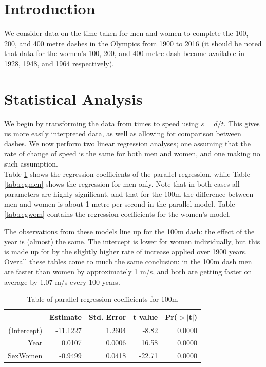 \documentclass[11pt]{article}
\begin{document}
\section{Introduction}
We consider data on the time taken for men and women to complete the 100, 200, and 400 metre dashes in the Olympics from 1900 to 2016 (it should be noted that data for the women's 100, 200, and 400 metre dash became available in 1928, 1948, and 1964 respectively). 

\section{Statistical Analysis}
We begin by transforming the data from times to speed using $s = d/t$. This gives us more easily interpreted data, as well as allowing for comparison between dashes. We now perform two linear regression analyses; one assuming that the rate of change of speed is the same for both men and women, and one making no such assumption.  \\

Table \ref{tab:reg1} shows the regression coefficients of the parallel regression, while Table \ref{tab:regmen} shows the regression for men only. Note that in both cases all parameters are highly significant, and that for the 100m the difference between men and women is about 1 metre per second in the parallel model. Table \ref{tab:regwom} contains the regression coefficients for the women's model.

The observations from these models line up for the 100m dash: the effect of the year is (almost) the same. The intercept is lower for women individually, but this is made up for by the slightly higher rate of increase applied over 1900 years. Overall these tables come to much the same conclusion: in the 100m dash men are faster than women by approximately 1 m/s, and both are getting faster on average by 1.07 m/s every 100 years.

\begin{table}[ht]
\centering
\begin{tabular}{rrrrr}
  \hline
 & Estimate & Std. Error & t value & Pr($>$$|$t$|$) \\ 
  \hline
(Intercept) & -11.1227 & 1.2604 & -8.82 & 0.0000 \\ 
  Year & 0.0107 & 0.0006 & 16.58 & 0.0000 \\ 
  SexWomen & -0.9499 & 0.0418 & -22.71 & 0.0000 \\ 
   \hline
\end{tabular}
\caption{Table of parallel regression coefficients for 100m}
\label{tab:reg1}
\end{table}
\end{document}
